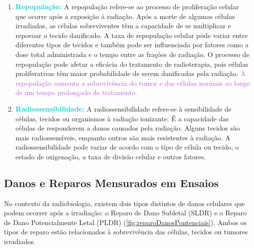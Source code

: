 \documentclass[11pt,a4paper]{article}
\begin{document}
\begin{enumerate}
		\item \textcolor{DarkTurquoise}{\textbf{Repopulação:}} A repopulação refere-se ao processo de proliferação celular que ocorre após a exposição à radiação. Após a morte de algumas células irradiadas, as células sobreviventes têm a capacidade de se multiplicar e repovoar o tecido danificado. A taxa de repopulação celular pode variar entre diferentes tipos de tecidos e também pode ser influenciada por fatores como a dose total administrada e o tempo entre as frações de radiação. O processo de repopulação pode afetar a eficácia do tratamento de radioterapia, pois células proliferativas têm maior probabilidade de serem danificadas pela radiação. \textcolor{MediumOrchid}{A repopulação aumenta a sobrevivência do tumor e das células normais ao longo de um tempo prolongado de tratamento.}
		
		\item \textcolor{DarkTurquoise}{\textbf{Radiossensibilidade:}} A radiossensibilidade refere-se à sensibilidade de células, tecidos ou organismos à radiação ionizante. É a capacidade das células de responderem a danos causados pela radiação. Alguns tecidos são mais radiossensíveis, enquanto outros são mais resistentes à radiação. A radiossensibilidade pode variar de acordo com o tipo de célula ou tecido, o estado de oxigenação, a taxa de divisão celular e outros fatores.
	\end{enumerate}

\subsection*{Danos e Reparos Mensurados em Ensaios}

	No contexto da radiobiologia, existem dois tipos distintos de danos celulares que podem ocorrer após a irradiação: o Reparo de Dano Subletal (SLDR) e o Reparo de Dano Potencialmente Letal (PLDR) (\ref{fig:reparoDanosPontenciais}). Ambos os tipos de reparo estão relacionados à sobrevivência das células, tecidos ou tumores irradiados.
\end{document}
